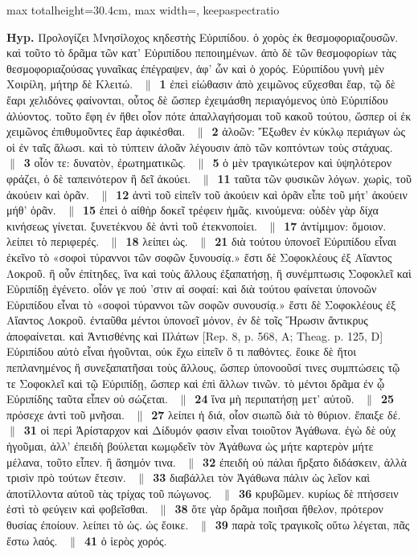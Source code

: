 \documentclass[11pt,twoside]{book}
\newcommand{\expo}[1]{\textsuperscript{#1}}
\newcommand{\espTest}{\ {\color{ruleGold}$\parallel$}\ }
\begin{document}
\begin{adjustbox}{max totalheight=30.4cm, max width=\textwidth, keepaspectratio}
\begin{minipage}{\textwidth}
{\noindent{\bfseries\scshape\color{rubricRed}Scholies marginales et gloses interlinéaires du folio ({\policeGr Σ}\expo{R}) :} \textbf{Hyp.} Προλογίζει Μνησίλοχος κηδεστὴς Εὐριπίδου. ὁ χορὸς ἐκ θεσμοφοριαζουσῶν. καὶ τοῦτο τὸ δρᾶμα τῶν κατ’ Εὐριπίδου πεποιημένων. ἀπὸ δὲ τῶν θεσμοφορίων τὰς θεσμοφοριαζούσας γυναῖκας ἐπέγραψεν, ἀφ’ ὧν καὶ ὁ χορός. Εὐριπίδου γυνὴ μὲν Χοιρίλη, μήτηρ δὲ Κλειτώ. \espTest \textbf{1} ἐπεὶ εἰώθασιν ἀπὸ χειμῶνος εὔχεσθαι ἔαρ, τῷ δὲ ἔαρι χελιδόνες φαίνονται, οὗτος δὲ ὥσπερ ἐχειμάσθη περιαγόμενος ὑπὸ Εὐριπίδου ἀλύοντος. τοῦτο ἔφη ἐν ἤθει οἷον πότε ἀπαλλαγήσομαι τοῦ κακοῦ τούτου, ὥσπερ οἱ ἐκ χειμῶνος ἐπιθυμοῦντες ἔαρ ἀφικέσθαι. \espTest \textbf{2} ἀλοῶν: Ἔξωθεν ἐν κύκλῳ περιάγων ὡς οἱ ἐν ταῖς ἅλωσι. καὶ τὸ τύπτειν ἀλοᾶν λέγουσιν ἀπὸ τῶν κοπτόντων τοὺς στάχυας. \espTest \textbf{3} οἷόν τε: δυνατὸν, ἐρωτηματικῶς. \espTest \textbf{5} ὁ μὲν τραγικώτερον καὶ ὑψηλότερον φράζει, ὁ δὲ ταπεινότερον ἢ δεῖ ἀκούει. \espTest \textbf{11} ταῦτα τῶν φυσικῶν λόγων. χωρὶς, τοῦ ἀκούειν καὶ ὁρᾶν. \espTest \textbf{12} ἀντὶ τοῦ εἰπεῖν τοῦ ἀκούειν καὶ ὁρᾶν εἶπε τοῦ μήτ’ ἀκούειν μήθ’ ὁρᾶν. \espTest \textbf{15} ἐπεὶ ὁ αἰθὴρ δοκεῖ τρέφειν ἡμᾶς. κινούμενα: οὐδὲν γὰρ δίχα κινήσεως γίνεται. ξυνετέκνου δὲ ἀντὶ τοῦ ἐτεκνοποίει. \espTest \textbf{17} ἀντίμιμον: ὅμοιον. λείπει τὸ περιφερές. \espTest \textbf{18} λείπει ὡς. \espTest \textbf{21} διὰ τούτου ὑπονοεῖ Εὐριπίδου εἶναι ἐκεῖνο τὸ «σοφοὶ τύραννοι τῶν σοφῶν ξυνουσίᾳ.» ἔστι δὲ Σοφοκλέους ἐξ Αἴαντος Λοκροῦ. ἢ οὖν ἐπίτηδες, ἵνα καὶ τοὺς ἄλλους ἐξαπατήσῃ, ἢ συνέμπτωσις Σοφοκλεῖ καὶ Εὐριπίδῃ ἐγένετο. οἷόν γε πού ’στιν αἱ σοφαί: καὶ διὰ τούτου φαίνεται ὑπονοῶν Εὐριπίδου εἶναι τὸ «σοφοὶ τύραννοι τῶν σοφῶν συνουσίᾳ.» ἔστι δὲ Σοφοκλέους ἐξ Αἴαντος Λοκροῦ. ἐνταῦθα μέντοι ὑπονοεῖ μόνον, ἐν δὲ τοῖς Ἥρωσιν ἄντικρυς ἀποφαίνεται. καὶ Ἀντισθένης καὶ Πλάτων [Rep. 8, p. 568, A; Theag. p. 125, D] Εὐριπίδου αὐτὸ εἶναι ἡγοῦνται, οὐκ ἔχω εἰπεῖν ὅ τι παθόντες. ἔοικε δὲ ἤτοι πεπλανημένος ἢ συνεξαπατῆσαι τοὺς ἄλλους, ὥσπερ ὑπονοοῦσί τινες συμπτώσεις τῷ τε Σοφοκλεῖ καὶ τῷ Εὐριπίδῃ, ὥσπερ καὶ ἐπὶ ἄλλων τινῶν. τὸ μέντοι δρᾶμα ἐν ᾧ Εὐριπίδης ταῦτα εἶπεν οὐ σώζεται. \espTest \textbf{24} ἵνα μὴ περιπατήσῃ μετ’ αὐτοῦ. \espTest \textbf{25} πρόσεχε ἀντὶ τοῦ μνῆσαι. \espTest \textbf{27} λείπει ἡ διά, οἷον σιωπῶ διὰ τὸ θύριον. ἔπαιξε δέ. \espTest \textbf{31} οἱ περὶ Ἀρίσταρχον καὶ Δίδυμόν φασιν εἶναι τοιοῦτον Ἀγάθωνα. ἐγὼ δὲ οὐχ ἡγοῦμαι, ἀλλ’ ἐπειδὴ βούλεται κωμῳδεῖν τὸν Ἀγάθωνα ὡς μήτε καρτερὸν μήτε μέλανα, τοῦτο εἶπεν. ἢ ἄσημόν τινα. \espTest \textbf{32} ἐπειδὴ οὐ πάλαι ἤρξατο διδάσκειν, ἀλλὰ τρισὶν πρὸ τούτων ἔτεσιν. \espTest \textbf{33} διαβάλλει τὸν Ἀγάθωνα πάλιν ὡς λεῖον καὶ ἀποτίλλοντα αὑτοῦ τὰς τρίχας τοῦ πώγωνος. \espTest \textbf{36} κρυβῶμεν. κυρίως δὲ πτήσσειν ἐστὶ τὸ φεύγειν καὶ φοβεῖσθαι. \espTest \textbf{38} ὅτε γὰρ δρᾶμα ποιῆσαι ἤθελον, πρότερον θυσίας ἐποίουν. λείπει τὸ ὡς. ὡς ἔοικε. \espTest \textbf{39} παρὰ τοῖς τραγικοῖς οὕτω λέγεται, πᾶς ἔστω λαός. \espTest \textbf{41} ὁ ἱερὸς χορός.\par\vspace{2.0pt}
}
\end{minipage}
\end{adjustbox}
\end{document}
